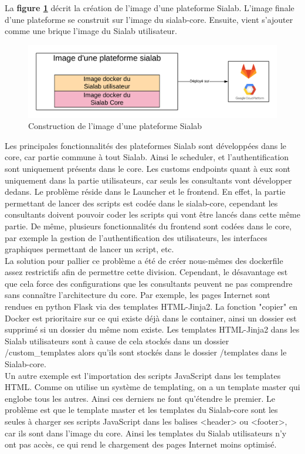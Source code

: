 \documentclass{article} %
\begin{document}
{La \textbf{figure \ref{fig:siasia}} décrit la création de l'image d'une plateforme Sialab. L'image finale d'une plateforme se construit sur l'image du sialab-core. Ensuite, vient s'ajouter comme une brique l'image du Sialab utilisateur. 
\begin{figure}[!h]
 \centering
 \includegraphics[keepaspectratio = true,scale=0.6]{sia-core.png}
 \caption{Construction de l'image d'une plateforme Sialab}
 \label{fig:siasia}
\end{figure}

Les principales fonctionnalités des plateformes Sialab sont développées dans le core, car partie commune à tout Sialab. Ainsi le scheduler, et l'authentification sont uniquement présents dans le core. Les customs endpoints quant à eux sont uniquement dans la partie utilisateurs, car seuls les consultants vont développer dedans. Le problème réside dans le Launcher et le frontend. En effet, la partie permettant de lancer des scripts est codée dans le sialab-core, cependant les consultants doivent pouvoir coder les scripts qui vont être lancés dans cette même partie. De même, plusieurs fonctionnalités du frontend sont codées dans le core, par exemple la gestion de l'authentification des utilisateurs, les interfaces graphiques permettant de lancer un script, etc.\\

La solution pour pallier ce problème a été de créer nous-mêmes des dockerfile assez restrictifs afin de permettre cette division. Cependant, le désavantage est que cela force des configurations que les consultants peuvent ne pas comprendre sans connaître l'architecture du core. Par exemple, les pages Internet sont rendues en python Flask via des templates HTML-Jinja2. La fonction "copier" en Docker est prioritaire sur ce qui existe déjà dans le container, ainsi un dossier est supprimé si un dossier du même nom existe. Les templates HTML-Jinja2 dans les Sialab utilisateurs sont à cause de cela stockés dans un dossier /custom\_templates alors qu'ils sont stockés dans le dossier /templates dans le Sialab-core.\\
Un autre exemple est l'importation des scripts JavaScript dans les templates HTML. Comme on utilise un système de templating, on a un template master qui englobe tous les autres. Ainsi ces derniers ne font qu'étendre le premier. Le problème est que le template master et les templates du Sialab-core sont les seules à charger ses scripts JavaScript dans les balises <header> ou <footer>, car ils sont dans l'image du core. Ainsi les templates du Sialab utilisateurs n'y ont pas accès, ce qui rend le chargement des pages Internet moins optimisé.\\

}
\end{document}
